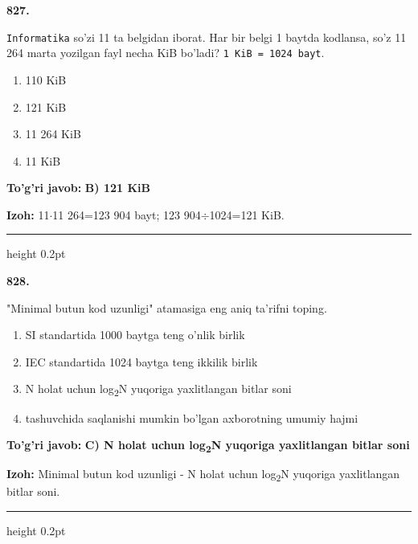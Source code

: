 \documentclass[10pt,a4paper,oneside]{article}
\begin{document}
\noindent\textbf{\color{ink}827.}
\par
\texttt{Informatika} so'zi 11 ta belgidan iborat. Har bir belgi 1 baytda kodlansa, so'z 11 264 marta yozilgan fayl necha KiB bo'ladi? \texttt{1 KiB = 1024 bayt}.
\begin{enumerate}[label=\Alph*),leftmargin=9mm]
\item 110 KiB
\item 121 KiB
\item 11 264 KiB
\item 11 KiB
\end{enumerate}
\begin{tcolorbox}[enhanced,breakable,colback=teal!4,colframe=teal!50!black,boxrule=0.5pt,arc=1.1mm,left=3mm,right=3mm,top=1.7mm,bottom=1.7mm,before skip=2mm,after skip=2mm]
\textbf{\color{teal}To'g'ri javob:} \textbf{B) 121 KiB}
\par\smallskip
\textbf{Izoh:} 11\ensuremath{\cdot}11 264=123 904 bayt; 123 904\ensuremath{\div}1024=121 KiB.
\end{tcolorbox}
\vspace{2mm}\hrule height 0.2pt \vspace{3mm}

\noindent\textbf{\color{ink}828.}
\par
"Minimal butun kod uzunligi" atamasiga eng aniq ta'rifni toping.
\begin{enumerate}[label=\Alph*),leftmargin=9mm]
\item SI standartida 1000 baytga teng o'nlik birlik
\item IEC standartida 1024 baytga teng ikkilik birlik
\item N holat uchun log\textsubscript{2}N yuqoriga yaxlitlangan bitlar soni
\item tashuvchida saqlanishi mumkin bo'lgan axborotning umumiy hajmi
\end{enumerate}
\begin{tcolorbox}[enhanced,breakable,colback=teal!4,colframe=teal!50!black,boxrule=0.5pt,arc=1.1mm,left=3mm,right=3mm,top=1.7mm,bottom=1.7mm,before skip=2mm,after skip=2mm]
\textbf{\color{teal}To'g'ri javob:} \textbf{C) N holat uchun log\textsubscript{2}N yuqoriga yaxlitlangan bitlar soni}
\par\smallskip
\textbf{Izoh:} Minimal butun kod uzunligi - N holat uchun log\textsubscript{2}N yuqoriga yaxlitlangan bitlar soni.
\end{tcolorbox}
\vspace{2mm}\hrule height 0.2pt \vspace{3mm}
\end{document}
